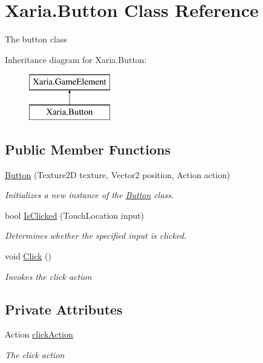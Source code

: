 \hypertarget{classXaria_1_1Button}{}\section{Xaria.\+Button Class Reference}
\label{classXaria_1_1Button}


The button class  


Inheritance diagram for Xaria.\+Button\+:\begin{figure}[H]
\begin{center}
\leavevmode
\includegraphics[height=2.000000cm]{classXaria_1_1Button}
\end{center}
\end{figure}
\subsection*{Public Member Functions}
\begin{DoxyCompactItemize}
\item 
\hyperlink{classXaria_1_1Button_adb44a71990a4da16b32e721b30a0d219}{Button} (Texture2D texture, Vector2 position, Action action)
\begin{DoxyCompactList}\small\item\em Initializes a new instance of the \hyperlink{classXaria_1_1Button}{Button} class. \end{DoxyCompactList}\item 
bool \hyperlink{classXaria_1_1Button_aa60b3edf6886916fb025d60db4645ade}{Is\+Clicked} (Touch\+Location input)
\begin{DoxyCompactList}\small\item\em Determines whether the specified input is clicked. \end{DoxyCompactList}\item 
void \hyperlink{classXaria_1_1Button_a774571620215fb6a3b1ae9315023bd41}{Click} ()
\begin{DoxyCompactList}\small\item\em Invokes the click action \end{DoxyCompactList}\end{DoxyCompactItemize}
\subsection*{Private Attributes}
\begin{DoxyCompactItemize}
\item 
Action \hyperlink{classXaria_1_1Button_adbeeb3818c76acb80a43342fc24f1f0f}{click\+Action}
\begin{DoxyCompactList}\small\item\em The click action \end{DoxyCompactList}\end{DoxyCompactItemize}
